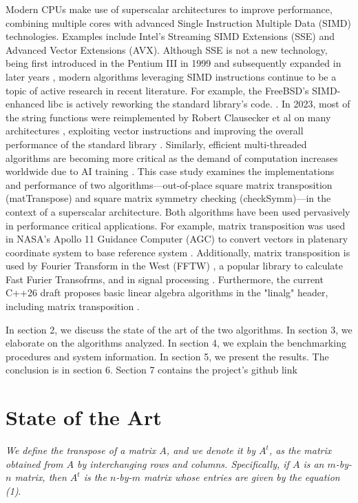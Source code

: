 \documentclass[conference]{IEEEtran}
\begin{document}
Modern CPUs make use of superscalar architectures to improve performance, combining multiple cores with advanced Single Instruction Multiple Data (SIMD) technologies. Examples include Intel's Streaming SIMD Extensions (SSE) and Advanced Vector Extensions (AVX). Although SSE is not a new technology, being first introduced in the Pentium III in 1999 and subsequently expanded in later years \cite{b1}, modern algorithms leveraging SIMD instructions continue to be a topic of active research in recent literature.
For example, the FreeBSD's SIMD-enhanced libc is actively reworking the standard library's code. \cite{b2}.
In 2023, most of the string functions were reimplemented by Robert Clausecker et al on many architectures \cite{b3}, exploiting vector instructions and improving the overall performance of the standard library \cite{b4}.
Similarly, efficient multi-threaded algorithms are becoming more critical as the demand of computation increases worldwide due to AI training \cite{b5} \cite{b6}.
This case study examines the implementations and performance of two algorithms—out-of-place square matrix transposition (matTranspose) and square matrix symmetry checking (checkSymm)—in the context of a superscalar architecture. Both algorithms have been used pervasively in performance critical applications. For example, matrix transposition was used in NASA's Apollo 11 Guidance Computer (AGC) to convert vectors in platenary coordinate system to base reference system \cite{b7}. Additionally, matrix transposition is used by Fourier Transform in the West (FFTW) \cite{b8}, a popular library to calculate Fast Furier Transofrms, and in signal processing \cite{b9}. Furthermore, the current C++26 draft proposes basic linear algebra algorithms in the "linalg" header, including matrix transposition \cite{b10}.

In section 2, we discuss the state of the art of the two algorithms.
In section 3, we elaborate on the algorithms analyzed.
In section 4, we explain the benchmarking procedures and system information.
In section 5, we present the results. The conclusion is in section 6. Section 7 contains
the project's github link


\section{State of the Art}

\iffalse

\textit{We define the transpose of a matrix $A$, and we denote it by $A^t$, as the matrix obtained from $A$ by interchanging rows and columns. Specifically, if $A$ is an $m$-by-$n$ matrix, then $A^t$ is the $n$-by-$m$ matrix whose entries are given by the equation (1)}. \cite{b11}
\end{document}
